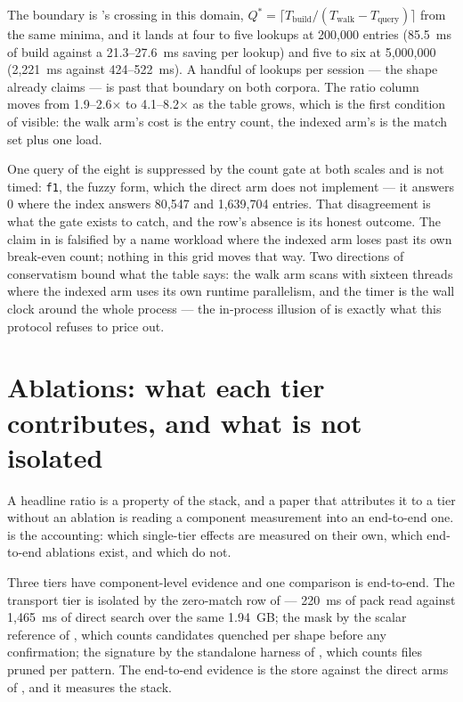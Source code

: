 \documentclass[11pt,letterpaper]{article}
\begin{document}
The boundary is 's crossing in this domain, $Q^{*} =
\lceil T_{\text{build}} / (T_{\text{walk}} - T_{\text{query}}) \rceil$
from the same minima, and it lands at four to five lookups at 200{,}000
entries (85.5~ms of build against a 21.3--27.6~ms saving per lookup) and
five to six at 5{,}000{,}000 (2{,}221~ms against 424--522~ms). A handful
of lookups per session --- the shape  already claims ---
is past that boundary on both corpora. The ratio column moves from
1.9--2.6$\times$ to 4.1--8.2$\times$ as the table grows, which is the
first condition of  visible: the walk arm's cost is the
entry count, the indexed arm's is the match set plus one load.

One query of the eight is suppressed by the count gate at both scales and
is not timed: \texttt{f1}, the fuzzy form, which the direct arm does not
implement --- it answers 0 where the index answers 80{,}547 and
1{,}639{,}704 entries. That disagreement is what the gate exists to
catch, and the row's absence is its honest outcome. The claim in
 is falsified by a name workload where the indexed arm
loses past its own break-even count; nothing in this grid moves that way.
Two directions of conservatism bound what the table says: the walk arm
scans with sixteen threads where the indexed arm uses its own runtime
parallelism, and the timer is the wall clock around the whole process ---
the in-process illusion of  is exactly what this protocol
refuses to price out.

\section{Ablations: what each tier contributes, and what is not isolated}
\label{sec:ablations}
A headline ratio is a property of the stack, and a paper that attributes
it to a tier without an ablation is reading a component measurement into
an end-to-end one.  is the accounting: which
single-tier effects are measured on their own, which end-to-end ablations
exist, and which do not.

Three tiers have component-level evidence and one comparison is
end-to-end. The transport tier is isolated by the zero-match row of
 --- 220~ms of pack read against 1{,}465~ms of direct
search over the same 1.94~GB; the mask by the scalar reference of
, which counts candidates quenched per shape before any
confirmation; the signature by the standalone harness of
, which counts files pruned per pattern. The end-to-end
evidence is the store against the direct arms of , and it
measures the stack.
\end{document}
